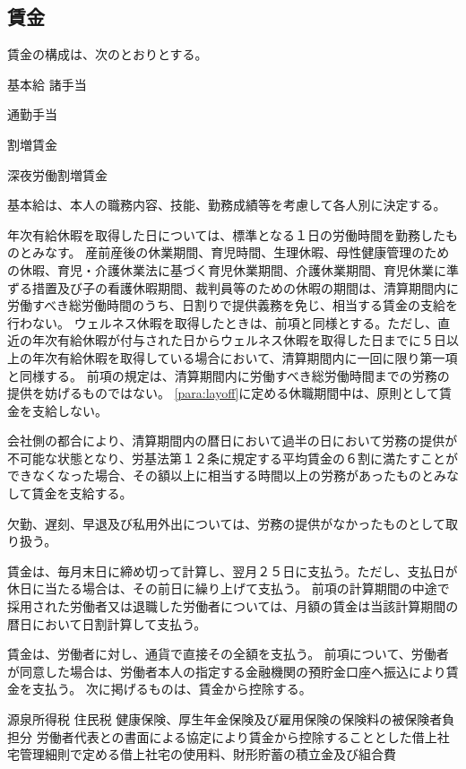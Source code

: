 \documentclass[10pt,a4paper,uplatex]{jsarticle}
\begin{document}
\subsection{賃金}

賃金の構成は、次のとおりとする。
\begin{enumerate}
    \itm 基本給
    \itm 諸手当
    \begin{enumerate}
        \itm 通勤手当
    \end{enumerate}
    \itm 割増賃金
    \begin{enumerate}
        \itm 深夜労働割増賃金
    \end{enumerate}
\end{enumerate}

基本給は、本人の職務内容、技能、勤務成績等を考慮して各人別に決定する。

年次有給休暇を取得した日については、標準となる１日の労働時間を勤務したものとみなす。
\term
産前産後の休業期間、育児時間、生理休暇、母性健康管理のための休暇、育児・介護休業法に基づく育児休業期間、介護休業期間、育児休業に準ずる措置及び子の看護休暇期間、裁判員等のための休暇の期間は、清算期間内に労働すべき総労働時間のうち、日割りで提供義務を免じ、相当する賃金の支給を行わない。 
\term 
ウェルネス休暇を取得したときは、前項と同様とする。ただし、直近の年次有給休暇が付与された日からウェルネス休暇を取得した日までに５日以上の年次有給休暇を取得している場合において、清算期間内に一回に限り第一項と同様する。
\term
前項の規定は、清算期間内に労働すべき総労働時間までの労務の提供を妨げるものではない。
\term
\ref{para:layoff}に定める休職期間中は、原則として賃金を支給しない。

会社側の都合により、清算期間内の暦日において過半の日において労務の提供が不可能な状態となり、労基法第１２条に規定する平均賃金の６割に満たすことができなくなった場合、その額以上に相当する時間以上の労務があったものとみなして賃金を支給する。

欠勤、遅刻、早退及び私用外出については、労務の提供がなかったものとして取り扱う。

賃金は、毎月末日に締め切って計算し、翌月２５日に支払う。ただし、支払日が休日に当たる場合は、その前日に繰り上げて支払う。
\term
前項の計算期間の中途で採用された労働者又は退職した労働者については、月額の賃金は当該計算期間の暦日において日割計算して支払う。

賃金は、労働者に対し、通貨で直接その全額を支払う。
\term
前項について、労働者が同意した場合は、労働者本人の指定する金融機関の預貯金口座へ振込により賃金を支払う。
\term
次に掲げるものは、賃金から控除する。
\begin{enumerate}
    \itm 源泉所得税
    \itm 住民税
    \itm 健康保険、厚生年金保険及び雇用保険の保険料の被保険者負担分
    \itm 労働者代表との書面による協定により賃金から控除することとした借上社宅管理細則で定める借上社宅の使用料、財形貯蓄の積立金及び組合費
\end{enumerate}
\end{document}
